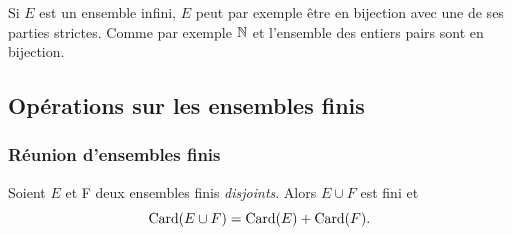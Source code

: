 Si \(E\) est un ensemble infini, \(E\) peut par exemple être en bijection
avec une de ses parties strictes. Comme par exemple \(\mathbb{N}\) et l'ensemble des
entiers pairs sont en bijection.

\subsection{Opérations sur les ensembles finis}

\subsubsection{Réunion d'ensembles finis}

\begin{prop}
  \label{prop:reunionfindis}
  Soient \(E\) et F deux ensembles finis \emph{disjoints}. Alors \(E\cup F\)
  est fini et
  \begin{equation}
    \operatorname{Card}(E\cup F) = \operatorname{Card}(E) + \operatorname{Card}(F).
  \end{equation}
\end{prop}

